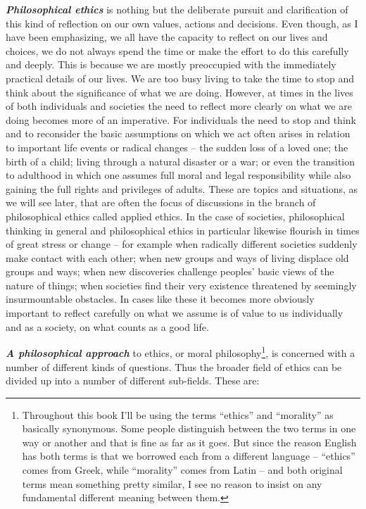 \documentclass[12pt, openany]{book}
\begin{document}
\textbf{\emph{Philosophical ethics}} is nothing but the deliberate pursuit and clarification of this kind of reflection on our own values, actions and decisions. Even though, as I have been emphasizing, we all have the capacity to reflect on our lives and choices, we do not always spend the time or make the effort to do this carefully and deeply. This is because we are mostly preoccupied with the immediately practical details of our lives. We are too busy living to take the time to stop and think about the significance of what we are doing. However, at times in the lives of both individuals and societies the need to reflect more clearly on what we are doing becomes more of an imperative. For individuals the need to stop and think and to reconsider the basic assumptions on which we act often arises in relation to important life events or radical changes -- the sudden loss of a loved one; the birth of a child; living through a natural disaster or a war; or even the transition to adulthood in which one assumes full moral and legal responsibility while also gaining the full rights and privileges of adults. These are topics and situations, as we will see later, that are often the focus of discussions in the branch of philosophical ethics called applied ethics. In the case of societies, philosophical thinking in general and philosophical ethics in particular likewise flourish in times of great stress or change -- for example when radically different societies suddenly make contact with each other; when new groups and ways of living displace old groups and ways; when new discoveries challenge peoples' basic views of the nature of things; when societies find their very existence threatened by seemingly insurmountable obstacles. In cases like these it becomes more obviously important to reflect carefully on what we assume is of value to us individually and as a society, on what counts as a good life.

\textbf{\emph{A philosophical approach}} to ethics, or moral philosophy\footnote{Throughout this book I'll be using the terms ``ethics'' and ``morality'' as basically synonymous. Some people distinguish between the two terms in one way or another and that is fine as far as it goes. But since the reason English has both terms is that we borrowed each from a different language -- ``ethics'' comes from Greek, while ``morality'' comes from Latin -- and both original terms mean something pretty similar, I see no reason to insist on any fundamental different meaning between them.}, is concerned with a number of different kinds of questions. Thus the broader field of ethics can be divided up into a number of different sub-fields. These are:
\end{document}

